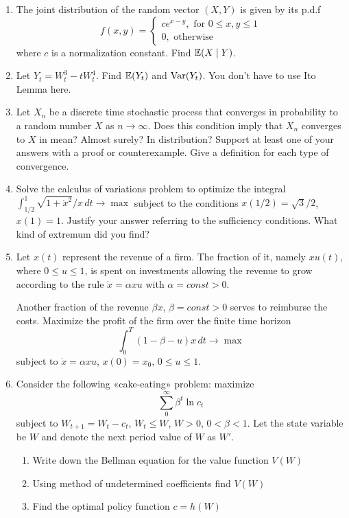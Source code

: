\documentclass[12pt, a4paper]{article}
\begin{document}
\begin{enumerate}
\item  The joint distribution of the random vector $(X,Y)$ is given by its p.d.f
\[
f(x,y)=
\left\{
  \begin{array}{l}
    c e^{x-y}, \text{ for } 0\leq x,y\leq 1 \\
    0, \text{ otherwise}
  \end{array}
\right.
\]
where $c$ is a normalization constant. Find $\operatorname{\mathbb{E}}(X\mid Y)$.

\item Let $Y_t=W_t^3-tW_t^4$. Find $\operatorname{\mathbb{E}}(Y_t)$ and $\operatorname{Var}(Y_t)$.  You don’t have to use Ito Lemma here.
\item Let $X_n$ be a discrete time stochastic process that converges in probability to a random number $X$ as $n\to \infty$. Does this condition imply that $X_n$ converges to $X$ in mean? Almost surely? In distribution? Support at least one of your answers with a proof or counterexample. Give a definition for each type of convergence.

\item Solve the calculus of variations problem to optimize the integral
$ \int_{1/2}^1 \sqrt{1+\dot{x}^2}/x\,dt \to \max $
subject to the conditions $x(1/2)=\sqrt{3}/2$, $x(1)=1$. Justify your answer referring to the sufficiency conditions. What kind of extremum did you find?

\item Let $x(t)$ represent the revenue of a firm. The fraction of it, namely $xu(t)$, where $0\leq u\leq 1$, is spent on investments allowing the revenue to grow according to the rule $\dot{x}=\alpha x u$ with $\alpha=const>0$.

Another fraction of the revenue $\beta x$, $\beta=const>0$ serves to reimburse the costs. Maximize the profit of the firm over the finite time horizon
\[
\int_0^T (1-\beta-u)x\, dt \to \max
\]
subject to $\dot{x}=\alpha x u$, $x(0)=x_0$, $0\leq u\leq 1$.

\item Consider the following «cake-eating» problem: maximize
\[
\sum_0^{\infty} \beta^t \ln c_t
\]
subject to $W_{t+1}=W_t-c_t$, $W_t\leq W$, $W>0$, $0<\beta<1$. Let the state variable be $W$ and denote the next period value of $W$ as $W'$.
\begin{enumerate}
\item Write down the Bellman equation for the value function $V(W)$
\item Using method of undetermined coefficients find $V(W)$
\item Find the optimal policy function $c=h(W)$
\end{enumerate}

\end{enumerate}
\end{document}
